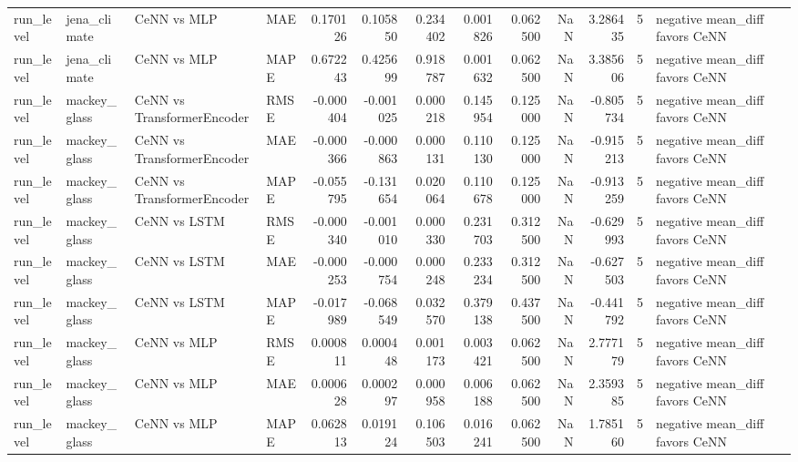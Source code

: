\begin{tabular}{llllrrrrrrrrl}
run_level & jena_climate & CeNN vs MLP & MAE & 0.170126 & 0.105850 & 0.234402 & 0.001826 & 0.062500 & NaN & 3.286435 & 5 & negative mean_diff favors CeNN \\
run_level & jena_climate & CeNN vs MLP & MAPE & 0.672243 & 0.425699 & 0.918787 & 0.001632 & 0.062500 & NaN & 3.385606 & 5 & negative mean_diff favors CeNN \\
run_level & mackey_glass & CeNN vs TransformerEncoder & RMSE & -0.000404 & -0.001025 & 0.000218 & 0.145954 & 0.125000 & NaN & -0.805734 & 5 & negative mean_diff favors CeNN \\
run_level & mackey_glass & CeNN vs TransformerEncoder & MAE & -0.000366 & -0.000863 & 0.000131 & 0.110130 & 0.125000 & NaN & -0.915213 & 5 & negative mean_diff favors CeNN \\
run_level & mackey_glass & CeNN vs TransformerEncoder & MAPE & -0.055795 & -0.131654 & 0.020064 & 0.110678 & 0.125000 & NaN & -0.913259 & 5 & negative mean_diff favors CeNN \\
run_level & mackey_glass & CeNN vs LSTM & RMSE & -0.000340 & -0.001010 & 0.000330 & 0.231703 & 0.312500 & NaN & -0.629993 & 5 & negative mean_diff favors CeNN \\
run_level & mackey_glass & CeNN vs LSTM & MAE & -0.000253 & -0.000754 & 0.000248 & 0.233234 & 0.312500 & NaN & -0.627503 & 5 & negative mean_diff favors CeNN \\
run_level & mackey_glass & CeNN vs LSTM & MAPE & -0.017989 & -0.068549 & 0.032570 & 0.379138 & 0.437500 & NaN & -0.441792 & 5 & negative mean_diff favors CeNN \\
run_level & mackey_glass & CeNN vs MLP & RMSE & 0.000811 & 0.000448 & 0.001173 & 0.003421 & 0.062500 & NaN & 2.777179 & 5 & negative mean_diff favors CeNN \\
run_level & mackey_glass & CeNN vs MLP & MAE & 0.000628 & 0.000297 & 0.000958 & 0.006188 & 0.062500 & NaN & 2.359385 & 5 & negative mean_diff favors CeNN \\
run_level & mackey_glass & CeNN vs MLP & MAPE & 0.062813 & 0.019124 & 0.106503 & 0.016241 & 0.062500 & NaN & 1.785160 & 5 & negative mean_diff favors CeNN \\
\bottomrule
\end{tabular}
